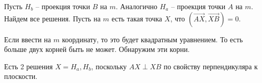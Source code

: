 Пусть $H_b$ -- проекция точки $B$ на $m$. Аналогично $H_a$ -- проекция точки $A$ на $m$. Найдем все решения. Пусть на $m$ есть такая точка $X$, что $(\overrightarrow{AX}, \overrightarrow{XB})=0$.

Если ввести на $m$ координату, то это будет квадратным уравнением. То есть больше двух корней быть не может. Обнаружим эти корни.

Есть 2 решения $X=H_a, H_b$, поскольку $AX\perp XB$ по свойству перпендикуляра к плоскости.